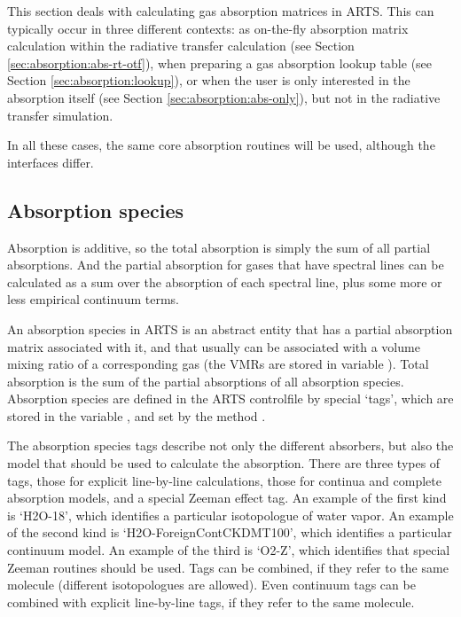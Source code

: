 This section deals with calculating gas absorption matrices in
ARTS.  This can typically occur in three different contexts:
as on-the-fly absorption matrix calculation within the radiative transfer
calculation (see Section \ref{sec:absorption:abs-rt-otf}), when preparing
a gas absorption lookup table (see Section \ref{sec:absorption:lookup}),
or when the user is only interested in the absorption itself (see Section
\ref{sec:absorption:abs-only}), but not in the radiative transfer simulation.

In all these cases, the same core absorption routines will be used,
although the interfaces differ. 

\subsection{Absorption species}

Absorption is additive, so the total absorption is simply the sum of
all partial absorptions.  And the partial absorption for gases that
have spectral lines can be calculated as a sum over the absorption of
each spectral line, plus some more or less empirical continuum terms.

An absorption species in ARTS is an abstract entity that has a partial
absorption matrix associated with it, and that usually can be
associated with a volume mixing ratio of a corresponding gas (the VMRs
are stored in variable ). Total absorption is the
sum of the partial absorptions of all absorption species. Absorption
species are defined in the ARTS controlfile by special `tags', which
are stored in the variable , and set by the
method .

The absorption species tags describe not only the different absorbers,
but also the model that should be used to calculate the absorption.
There are three types of tags, those for explicit line-by-line
calculations, those for continua and complete absorption models, and a special Zeeman effect tag.
An example of the first kind is `H2O-18', which identifies a
particular isotopologue of water vapor.  An example of the second kind is
`H2O-ForeignContCKDMT100', which identifies a particular continuum
model.  An example of the third is `O2-Z', which identifies that special Zeeman routines should be used.
Tags can be combined, if they refer to the same molecule
(different isotopologues are allowed). Even continuum tags can be combined
with explicit line-by-line tags, if they refer to the same molecule.

